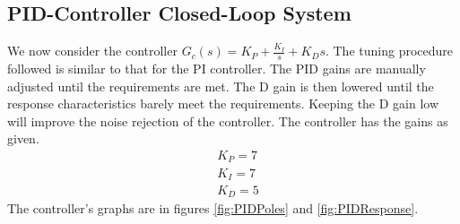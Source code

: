 \documentclass{article}
\begin{document}
    \subsection{PID-Controller Closed-Loop System}
    We now consider the controller $G_c(s)=K_P+\frac{K_I}{s}+K_Ds$.
    The tuning procedure followed is similar to that for the PI controller. 
    The PID gains are manually adjusted until the requirements are met.
    The D gain is then lowered until the response characteristics barely meet the requirements.
    Keeping the D gain low will improve the noise rejection of the controller.
    The controller has the gains as given.
    \begin{equation}
        \begin{aligned}
            &K_P=7\\
            &K_I=7\\
            &K_D=5
        \end{aligned}
    \end{equation}
    The controller's graphs are in figures \ref{fig:PIDPoles} and \ref{fig:PIDResponse}.
\end{document}
